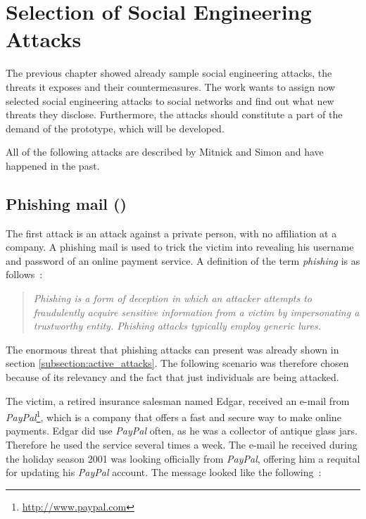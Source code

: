 \chapter{Selection of Social Engineering Attacks}
\label{chap:attacks}

The previous chapter showed already sample social engineering attacks, the
threats it exposes and their countermeasures. The work wants to assign now selected
social engineering attacks to social networks and find out what new threats
they disclose. Furthermore, the attacks should constitute a part of the demand
of the prototype, which will be developed.

All of the following attacks are described by Mitnick and Simon
\cite{mitnick2003} and have happened in the past.

\section[Phishing mail]{Phishing mail (\cite[pp. 97-100]{mitnick2003})}
\label{sec:phishing_mail}

The first attack is an attack against a private person, with no affiliation at
a company. A phishing mail is used to trick the victim into revealing his
username and password of an online payment service. A definition of the term
\textit{phishing} is as follows~\cite{jagatic2007}:

\begin{quote}
\textit{Phishing is a form of deception in which an attacker attempts to
fraudulently acquire sensitive information from a victim by impersonating a
trustworthy entity. Phishing attacks typically employ generic
\glqq{}lures\grqq{}.}
\end{quote}

The enormous threat that phishing attacks can present was already shown in
section \ref{subsection:active_attacks}. The following scenario was therefore
chosen because of its relevancy and the fact that just individuals are being
attacked.

The victim, a retired insurance salesman named Edgar, received an e-mail from
\textit{PayPal}\footnote{\url{http://www.paypal.com}}, which is a company that
offers a fast and secure way to make online payments. Edgar did use
\textit{PayPal} often, as he was a collector of antique glass jars. Therefore
he used the service several times a week. The e-mail he received during the
holiday season 2001 was looking officially from \textit{PayPal}, offering him a
requital for updating his \textit{PayPal} account. The message looked like the
following~\cite[p. 97]{mitnick2003}:

